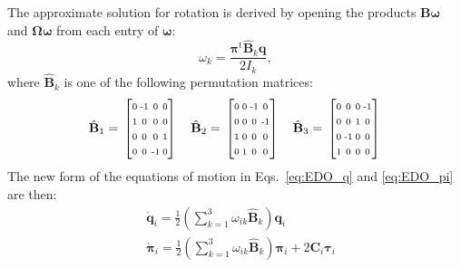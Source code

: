 \documentclass[aip,jcp,reprint,amsmath,amssymb]{revtex4-1}
\makeatletter
\newcommand{\mt}[1]{\boldsymbol{\mathbf{#1}}}           %
\newcommand{\vt}[1]{\boldsymbol{\mathbf{#1}}}           %
\newcommand{\tr}[1]{#1^\text{t}}                        %
\newenvironment{smallarray}[1]                          %
{\null\,\vcenter\bgroup\scriptsize
	\renewcommand{\arraystretch}{1.5}
	\arraycolsep=.13885em
	\hbox\bgroup$\left[\array{@{}#1@{}}}
{\endarray\right]$\egroup\egroup\,\null}
\makeatother
\begin{document}
The approximate solution for rotation is derived by opening the products $\mt B \vt \omega$ and $\mt \Omega \vt \omega$ from each entry of $\vt \omega$: 
\begin{equation}
\label{eq:omega_entry}
\omega_k = \frac{\tr{\vt \pi} \hat{\mt B}_k \vt q}{2 I_k},
\end{equation}
where $\hat{\mt B}_k$ is one of the following permutation matrices:
\[
\hat{\mt B}_1 = \begin{smallarray}{cccc}
 0 & \text{-}1 &  0 &  0 \\
 1 &  0 &  0 &  0 \\
 0 &  0 &  0 &  1 \\
 0 &  0 & \text{-}1 &  0 \\
\end{smallarray} \quad
\hat{\mt B}_2 = \begin{smallarray}{cccc}
 0 &  0 & \text{-}1 &  0 \\
 0 &  0 &  0 & \text{-}1 \\
 1 &  0 &  0 &  0 \\
 0 &  1 &  0 &  0 \\
\end{smallarray} \quad
\hat{\mt B}_3 = \begin{smallarray}{cccc}
 0 &  0 &  0 & \text{-}1 \\
 0 &  0 &  1 &  0 \\
 0 & \text{-}1 &  0 &  0 \\
 1 &  0 &  0 &  0 \\
\end{smallarray}
\]
The new form of the equations of motion in Eqs.~\eqref{eq:EDO_q} and \eqref{eq:EDO_pi} are then:
\begin{subequations}
\label{eq:EDO_system_alternative}
\begin{align}
&\dot{\vt q}_i = \frac{1}{2} \left( \sum_{k=1}^3 \omega_{ik} \hat{\mt B}_k \right) \vt q_i \label{eq:edo_q} \\
&\dot{\vt \pi}_i = \frac{1}{2} \left( \sum_{k=1}^3 \omega_{ik} \hat{\mt B}_k \right) \vt \pi_i + 2 \mt C_i \vt \tau_i \label{eq:edo_pi}
\end{align}
\end{subequations}
\end{document}
